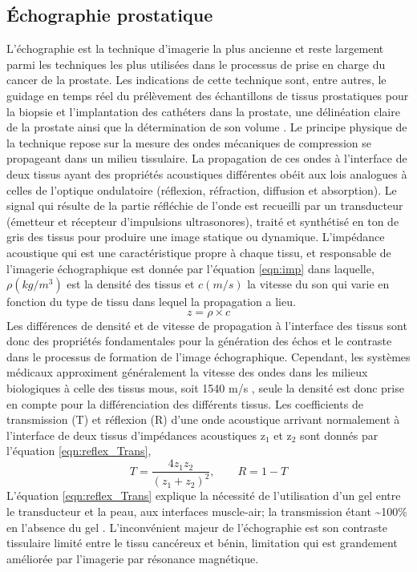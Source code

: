 \subsection*{\textbf{Échographie prostatique}}
L’échographie est la technique d’imagerie la plus ancienne et reste largement parmi les techniques les plus utilisées dans le processus de prise en charge du cancer de la prostate. Les indications de cette technique sont, entre autres, le guidage en temps réel du prélèvement des échantillons de tissus prostatiques pour la biopsie et l’implantation des cathéters dans la prostate, une délinéation claire de la prostate ainsi que la détermination de son volume \cite{Sarkar, Taneja, Dubinsky, Kirkham, Holm2002}. Le principe physique de la technique repose sur la mesure des ondes mécaniques de compression se propageant dans un milieu tissulaire. La propagation de ces ondes à l’interface de deux tissus ayant des propriétés acoustiques différentes obéit aux lois analogues à celles de l’optique ondulatoire (réflexion, réfraction, diffusion et absorption). Le signal qui résulte de la partie réfléchie de l’onde est recueilli par un transducteur (émetteur et récepteur d’impulsions ultrasonores), traité et synthétisé en ton de gris des tissus pour produire une image statique ou dynamique. L’impédance acoustique qui est une caractéristique propre à chaque tissu, et responsable de l’imagerie échographique est donnée par l’équation \eqref{eqn:imp} dans laquelle, $\rho \left(kg/m^{3}\right)$ est la densité des tissus et $c \left(m/s\right)$ la vitesse du son  qui varie en fonction du type de tissu dans lequel la propagation a lieu.
%
\begin{equation}\label{eqn:imp}
	z = \rho \times c
\end{equation}
%
Les différences de densité et de vitesse de propagation à l’interface des tissus sont donc des propriétés fondamentales pour la génération des échos et le contraste dans le processus de formation de l’image échographique. Cependant, les systèmes médicaux approximent généralement la vitesse des ondes dans les milieux biologiques à celle des tissus mous, soit 1540 m/s \cite{Bushberg}, seule la densité est donc prise en compte pour la différenciation des différents tissus. Les coefficients de transmission (T) et réflexion (R) d’une onde acoustique arrivant normalement à l’interface de deux tissus d’impédances acoustiques z$_{1}$ et z$_{2}$ sont donnés par l’équation \eqref{eqn:reflex_Trans},
%
\begin{equation}\label{eqn:reflex_Trans}
	T = \frac{4z_{1}z_{2}}{\left(z_{1}+z_{2}\right)^{2}}, \qquad R = 1-T
\end{equation}
%
L’équation \eqref{eqn:reflex_Trans} explique la nécessité de l’utilisation d’un gel entre le transducteur et la peau, aux interfaces muscle-air; la transmission étant \textasciitilde 100\% en l’absence du gel \cite{ EPoulin}. L’inconvénient majeur de l’échographie est son contraste tissulaire limité entre le tissu cancéreux et bénin, limitation qui est grandement améliorée par l’imagerie par résonance magnétique.
%
